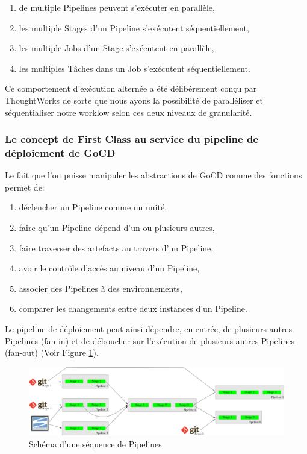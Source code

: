     \begin{enumerate}
      \item de multiple Pipelines peuvent s'exécuter en parallèle,
      \item les multiple Stages d'un Pipeline s'exécutent séquentiellement,
      \item les multiple Jobs d'un Stage s'exécutent en parallèle,
      \item les multiples Tâches dans un Job s'exécutent séquentiellement.\\
    \end{enumerate}

    Ce comportement d'exécution alternée a été délibérement conçu par ThoughtWorks de sorte que nous ayons la possibilité de paralléliser et séquentialiser notre worklow selon ces deux niveaux de granularité.

    \subsubsection{Le concept de First Class au service du pipeline de déploiement de GoCD}
    Le fait que l'on puisse manipuler les abstractions de GoCD comme des fonctions permet de:\\

    \begin{enumerate}
      \item déclencher un Pipeline comme un unité,
      \item faire qu'un Pipeline dépend d'un ou plusieurs autres,
      \item faire traverser des artefacts au travers d'un Pipeline,
      \item avoir le contrôle d'accès au niveau d'un Pipeline,
      \item associer des Pipelines à des environnements,
      \item comparer les changements entre deux instances d'un Pipeline.\\
    \end{enumerate}

    Le pipeline de déploiement peut ainsi dépendre, en entrée, de plusieurs autres Pipelines (fan-in) et de déboucher sur l'exécution de plusieurs autres Pipelines (fan-out) (Voir Figure \ref{VSM}).

    \begin{figure}
      \begin{center}
        \includegraphics[scale=0.7]{images/VSM.png}
      \end{center}
      \caption{Schéma d'une séquence de Pipelines}
      \label{VSM}
    \end{figure}

